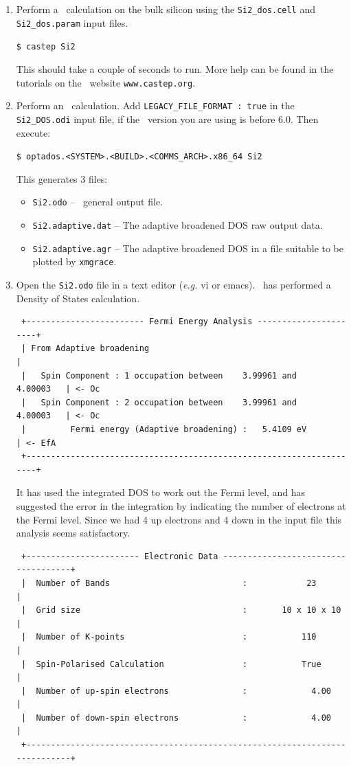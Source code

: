 \documentclass[a4paper,11pt,twoside]{book}
\begin{document}
{\begin{enumerate}
\item Perform a \castep\ calculation on the bulk silicon using the  \verb#Si2_dos.cell#  and \verb#Si2_dos.param# input files. 

  \verb#$ castep Si2# 

This should take a couple of seconds to run. More help can be found in  the tutorials  on  the \castep\ website \verb#www.castep.org#.  

\item Perform an \optados\ calculation.  Add \verb#LEGACY_FILE_FORMAT : true# in the \verb#Si2_DOS.odi# input file, if the \castep\ version you are using is before 6.0. Then execute:   
 
\verb#$ optados.<SYSTEM>.<BUILD>.<COMMS_ARCH>.x86_64 Si2# 

This generates 3 files:
\begin{itemize}
\item \verb#Si2.odo# -- \optados\ general output file.
\item \verb#Si2.adaptive.dat# -- The adaptive broadened DOS raw output data.
\item  \verb#Si2.adaptive.agr# -- The adaptive broadened DOS in a file suitable to be plotted by  \verb#xmgrace#.   
\end{itemize}

\item Open the \verb#Si2.odo# file in a text editor (\emph{e.g.} vi or emacs).  \optados\ has performed a Density of States calculation.

\begin{verbatim}
 +------------------------ Fermi Energy Analysis ----------------------+
 | From Adaptive broadening                                            |
 |   Spin Component : 1 occupation between    3.99961 and    4.00003   | <- Oc
 |   Spin Component : 2 occupation between    3.99961 and    4.00003   | <- Oc
 |         Fermi energy (Adaptive broadening) :   5.4109 eV            | <- EfA
 +---------------------------------------------------------------------+
\end{verbatim}
It has used the integrated DOS to work out the Fermi level, and has suggested the error in the integration by indicating the number of electrons at the Fermi level. Since we had 4 up electrons and 4 down in the input file this analysis seems satisfactory.
\begin{verbatim}
 +----------------------- Electronic Data ------------------------------------+
 |  Number of Bands                           :            23                 |
 |  Grid size                                 :       10 x 10 x 10            |
 |  Number of K-points                        :           110                 |
 |  Spin-Polarised Calculation                :           True                |
 |  Number of up-spin electrons               :             4.00              |
 |  Number of down-spin electrons             :             4.00              |
 +----------------------------------------------------------------------------+
\end{verbatim}


\end{enumerate}}
\end{document}

